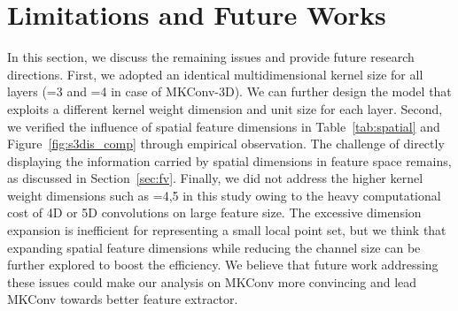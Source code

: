 \documentclass[preprint,12pt]{elsarticle}
\begin{document}
\begin{comment}
	\begin{table}[t]
		\begin{center}
			\footnotesize
			\begin{tabular}{c|cccc}
				\toprule
				Dataset & \#Points & \#Params & Training & Inference \\
				\midrule
				\midrule
				ModelNet40 & 1024  & 5.63M & 0.0430s & 0.0102s \\
				ShapeNetPart & 2048  & 17.98M & 0.0455s & 0.0167s\\
				
				\bottomrule
			\end{tabular}
			\vspace{0cm}
			\caption{Model statistics on ModelNet40, ShapeNetPart, and S3DIS. The number of parameters and training/inference speeds are reported.}
			\label{tab:comp}
		\end{center}
	\end{table}
\end{comment}








\section{Limitations and Future Works}

In this section, we discuss the remaining issues and provide future research directions. First, we adopted an identical multidimensional kernel size for all layers (=3 and =4 in case of MKConv-3D). We can further design the model that exploits a different kernel weight dimension  and unit size  for each layer. Second, we verified the influence of spatial feature dimensions in Table~\ref{tab:spatial} and Figure~\ref{fig:s3dis_comp} through empirical observation. The challenge of directly displaying the information carried by spatial dimensions in feature space remains, as discussed in Section~\ref{sec:fv}. Finally, we did not address the higher kernel weight dimensions such as =4,5 in this study owing to the heavy computational cost of 4D or 5D convolutions on large feature size. The excessive dimension expansion is inefficient for representing a small local point set, but we think that expanding spatial feature dimensions while reducing the channel size can be further explored to  boost the efficiency. We believe that future work addressing these issues could make our analysis on MKConv more convincing and lead MKConv towards better feature extractor.
\end{document}
